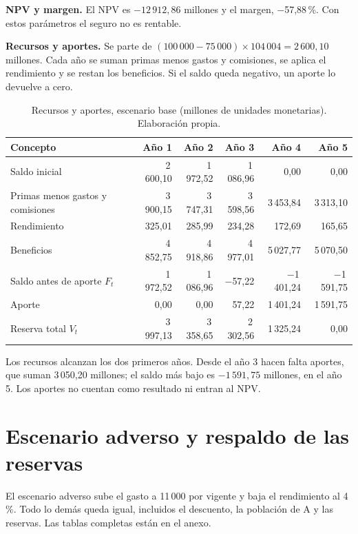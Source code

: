 \documentclass[11pt]{article}
\begin{document}
\textbf{NPV y margen.} El NPV es $-12\,912{,}86$ millones y el margen, $-$57,88\,\%. Con estos parámetros el seguro no es rentable.

\textbf{Recursos y aportes.} Se parte de $(100\,000 - 75\,000) \times 104\,004 = 2\,600{,}10$ millones. Cada año se suman primas menos gastos y comisiones, se aplica el rendimiento y se restan los beneficios. Si el saldo queda negativo, un aporte lo devuelve a cero.

\begin{table}[htbp]
\centering
\small
\begin{tabular}{lrrrrr}
\toprule
\textbf{Concepto} & \textbf{Año 1} & \textbf{Año 2} & \textbf{Año 3} & \textbf{Año 4} & \textbf{Año 5}\\
\midrule
Saldo inicial & 2\,600,10 & 1\,972,52 & 1\,086,96 & 0,00 & 0,00 \\
Primas menos gastos y comisiones & 3\,900,15 & 3\,747,31 & 3\,598,56 & 3\,453,84 & 3\,313,10 \\
Rendimiento & 325,01 & 285,99 & 234,28 & 172,69 & 165,65 \\
Beneficios & 4\,852,75 & 4\,918,86 & 4\,977,01 & 5\,027,77 & 5\,070,50 \\
\midrule
Saldo antes de aporte $F_t$ & 1\,972,52 & 1\,086,96 & $-$57,22 & $-$1\,401,24 & $-$1\,591,75 \\
Aporte & 0,00 & 0,00 & 57,22 & 1\,401,24 & 1\,591,75 \\
Reserva total $V_t$ & 3\,997,13 & 3\,358,65 & 2\,302,56 & 1\,325,24 & 0,00 \\
\bottomrule
\end{tabular}
\caption{Recursos y aportes, escenario base (millones de unidades monetarias). Elaboración propia.}
\end{table}

Los recursos alcanzan los dos primeros años. Desde el año 3 hacen falta aportes, que suman 3\,050,20 millones; el saldo más bajo es $-1\,591{,}75$ millones, en el año 5. Los aportes no cuentan como resultado ni entran al NPV.

\vspace{-0.6cm}

\section{Escenario adverso y respaldo de las reservas}

\vspace{-0.6cm}

El escenario adverso sube el gasto a 11\,000 por vigente y baja el rendimiento al 4\,\%. Todo lo demás queda igual, incluidos el descuento, la población de A y las reservas. Las tablas completas están en el anexo.
\end{document}
